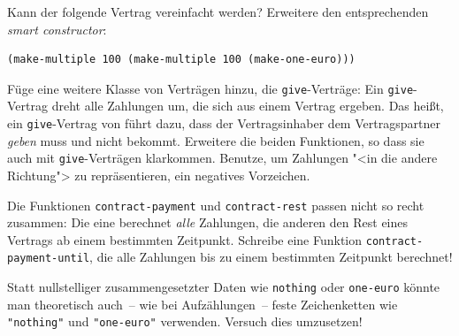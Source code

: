 \begin{aufgabe}
Kann der folgende Vertrag vereinfacht werden?  Erweitere den
entsprechenden \textit{smart constructor}:
\begin{lstlisting}
(make-multiple 100 (make-multiple 100 (make-one-euro)))    
\end{lstlisting}
%
\end{aufgabe}

\begin{aufgabe}\label{aufgabe:give}
  Füge eine weitere Klasse von Verträgen hinzu, die
  \lstinline{give}-Verträge: Ein \lstinline{give}-Vertrag dreht alle
  Zahlungen um, die sich aus einem Vertrag ergeben.  Das heißt, ein
  \lstinline{give}-Vertrag von  führt dazu, dass der
  Vertragsinhaber dem Vertragspartner  \emph{geben} muss und
  nicht bekommt.  Erweitere die beiden Funktionen, so dass sie auch
  mit \lstinline{give}-Verträgen klarkommen.  Benutze, um Zahlungen
  "<in die andere Richtung"> zu repräsentieren, ein negatives
  Vorzeichen.
\end{aufgabe}

\begin{aufgabe}
  Die Funktionen \lstinline{contract-payment} und
  \lstinline{contract-rest} passen nicht so recht zusammen: Die eine
  berechnet \emph{alle} Zahlungen, die anderen den Rest eines Vertrags
  ab einem bestimmten Zeitpunkt.  Schreibe eine Funktion
  \lstinline{contract-payment-until}, die alle Zahlungen bis zu einem
  bestimmten Zeitpunkt berechnet!
\end{aufgabe}

\begin{aufgabe}\label{aufgabe:aufzaehlung-vs-nullstellig}
  Statt nullstelliger zusammengesetzter Daten wie \lstinline{nothing}
  oder \lstinline{one-euro} könnte man theoretisch auch~-- wie bei
  Aufzählungen~-- feste Zeichenketten wie \lstinline{"nothing"} und
  \lstinline{"one-euro"} verwenden.  Versuch dies umzusetzen!
\end{aufgabe}



